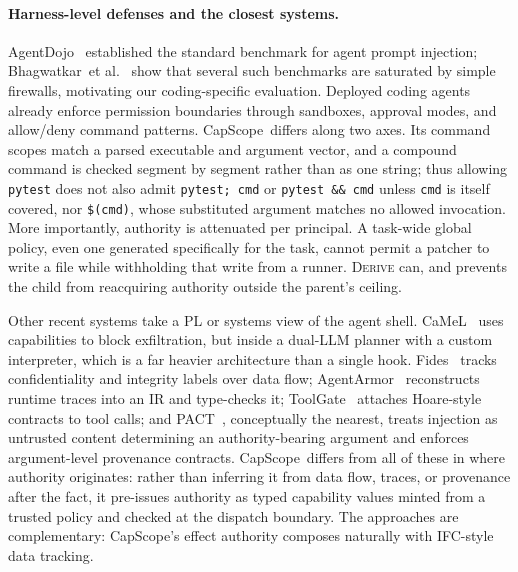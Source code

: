 \documentclass[sigplan,review,anonymous]{acmart}
\newcommand{\tool}{CapScope\xspace}
\newcommand{\etal}{et al.\xspace}
\newcommand{\rulename}[1]{\textsc{#1}}
\begin{document}
  \paragraph{Harness-level defenses and the closest systems.}
  AgentDojo~\cite{debenedetti2024agentdojo} established the standard
  benchmark for agent prompt injection; Bhagwatkar~\etal~\cite{bhagwatkar2025firewalls}
  show that several such benchmarks are saturated by simple firewalls,
  motivating our coding-specific evaluation. Deployed coding agents already
  enforce permission boundaries through sandboxes, approval modes, and allow/deny
  command patterns. \tool\ differs along two axes. Its command scopes match a
  parsed executable and argument vector, and a compound command is checked
  segment by segment rather than as one string; thus allowing \texttt{pytest}
  does not also admit \texttt{pytest; cmd} or \texttt{pytest \&\& cmd} unless
  \texttt{cmd} is itself covered, nor \texttt{\$(cmd)}, whose substituted
  argument matches no allowed invocation. More importantly, authority is
  attenuated per principal.
  A task-wide global policy, even one generated specifically for the task,
  cannot permit a patcher to write a file while withholding that write from a
  runner. \rulename{Derive} can, and prevents the child from reacquiring
  authority outside the parent's ceiling.

  Other
  recent systems take a PL or systems view of the agent shell. CaMeL~\cite{debenedetti2025camel}
  uses capabilities to block exfiltration, but inside a dual-LLM planner
  with a custom interpreter, which is a far heavier architecture than a single
  hook. Fides~\cite{costa2025fides} tracks confidentiality and integrity
  labels over data flow; AgentArmor~\cite{wang2025agentarmor} reconstructs
  runtime traces into an IR and type-checks it; ToolGate~\cite{liu2026toolgate}
  attaches Hoare-style contracts to tool calls; and
  PACT~\cite{fan2026pact}, conceptually the nearest, treats injection as
  untrusted content determining an authority-bearing argument and enforces
  argument-level provenance contracts. \tool\ differs from all of these in
  where authority originates: rather than inferring it from data flow,
  traces, or provenance after the fact, it pre-issues authority as typed
  capability values minted from a trusted policy and checked at the
  dispatch boundary. The approaches are complementary: \tool's effect
  authority composes naturally with IFC-style data tracking.
  
\end{document}
